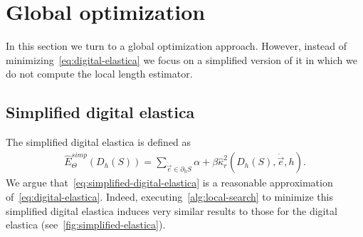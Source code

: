 \section{Global optimization}
\label{ch5:sec:global-optimization}
 In this section we turn to a global optimization approach. However, instead of minimizing~\cref{eq:digital-elastica} we focus on a simplified version of it in which we do not compute the local length estimator. 

\subsection{Simplified digital elastica}
\label{ch5:subsec:simplified-digital-elastica}

The simplified digital elastica is defined as
	\begin{align}
	\hat{E}_{\Theta}^{simp}( D_h(S) ) = \sum_{\dot{\vec{e}} \in \partial_h S}{ \alpha + \beta \hat{\kappa}_{r}^2(D_h(S),\dot{\vec{e}},h) }.
	\label{eq:simplified-digital-elastica}
	\end{align}
%	
%
We argue that~\cref{eq:simplified-digital-elastica} is a reasonable approximation of~\cref{eq:digital-elastica}. Indeed, executing~\cref{alg:local-search} to minimize this simplified digital elastica induces very similar results to those for the digital elastica (see~\cref{fig:simplified-elastica}).


